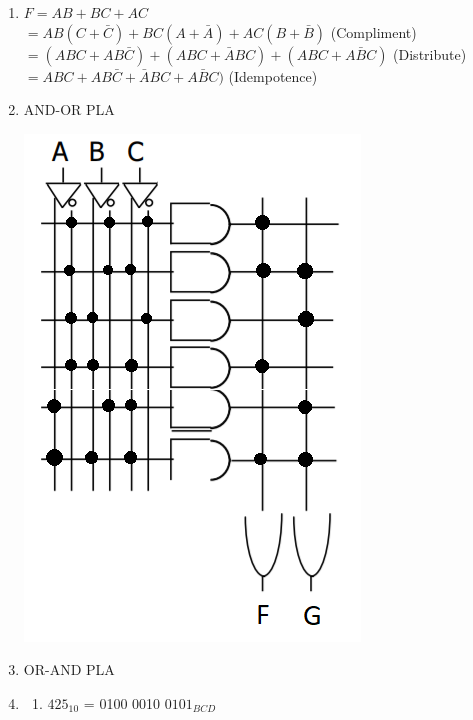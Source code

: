 \documentclass[a4paper]{article}
\begin{document}
\begin{enumerate}
        \item $F = AB + BC + AC$ \\
        $= AB(C+\bar{C}) + BC(A+\bar{A}) + AC(B+\bar{B})$ (Compliment) \\
        $= (ABC + AB\bar{C}) + (ABC + \bar{A}BC) + (ABC + A\bar{B}C)$ (Distribute) \\ 
        $= ABC + AB\bar{C} + \bar{A}BC + A\bar{B}C)$ (Idempotence)


        \newpage
        \item AND-OR PLA
        \begin{center}
            \includegraphics[scale=0.8]{4}
        \end{center}

        \item OR-AND PLA 
        \begin{center}
        \end{center}

        \vspace{7cm}
        \item
        \begin{enumerate}
        
            \item $425_{10}$ = 0100 0010 $0101_{BCD}$
        

\end{enumerate}
\end{enumerate}
\end{document}
